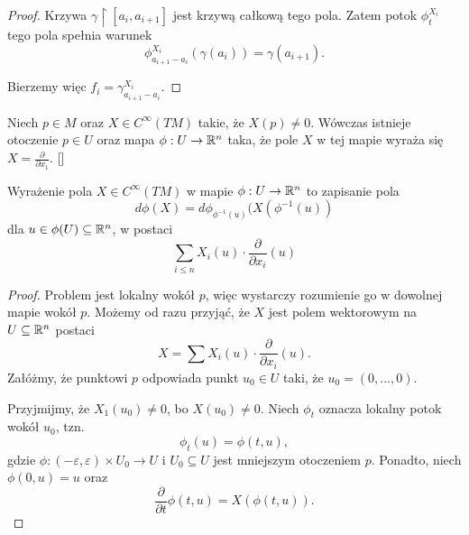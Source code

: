 \begin{example}
\begin{proof}
      Krzywa $\gamma\restriction[a_i,a_{i+1}]$ jest krzywą całkową tego pola. Zatem potok $\phi_t^{X_i}$ tego pola spełnia warunek
      $$\phi_{a_{i+1}-a_i}^{X_i}(\gamma(a_i))=\gamma(a_{i+1}).$$
      
      Bierzemy więc $f_i=\gamma_{a_{i+1}-a_i}^{X_i}$.
    \end{proof}
  \item Niech $p\in M$ oraz $X\in C^\infty(TM)$ takie, że $X(p)\neq 0$. Wówczas istnieje otoczenie $p\in U$ oraz mapa $\phi:U\to \mathbb{R}^n$ taka, że pole $X$ w tej mapie wyraża się $X=\frac{\partial}{\partial x_1}$. []

    Wyrażenie pola $X\in C^\infty(TM)$ w mapie $\phi:U\to\mathbb{R}^n$ to zapisanie pola 
    $$d\phi(X)=d\phi_{\phi^{-1}(u)}(X(\phi^{-1}(u))$$
    dla $u\in\phi(U)\subseteq\mathbb{R}^n$, w postaci
    $$\sum_{i\leq n}X_i(u)\cdot\frac{\partial}{\partial x_i}(u)$$
    
    \begin{proof}
      Problem jest lokalny wokół $p$, więc wystarczy rozumienie go w dowolnej mapie wokół $p$. Możemy od razu przyjąć, że $X$ jest polem wektorowym na $U\subseteq\mathbb{R}^n$ postaci
      $$X=\sum X_i(u)\cdot\frac{\partial}{\partial x_i}(u).$$
      Załóżmy, że punktowi $p$ odpowiada punkt $u_0\in U$ taki, że $u_0=(0,...,0)$.

      Przyjmijmy, że $X_1(u_0)\neq 0$, bo $X(u_0)\neq 0$. Niech $\phi_t$ oznacza lokalny potok wokół $u_0$, tzn.
      $$\phi_t(u)=\phi(t, u),$$
      gdzie $\phi:(-\varepsilon,\varepsilon)\times U_0\to U$ i $U_0\subseteq U$ jest mniejszym otoczeniem $p$. Ponadto, niech $\phi(0,u)=u$ oraz 
      $$\frac{\partial}{\partial t}\phi(t,u)=X(\phi(t,u)).$$


\end{proof}
\end{example}
